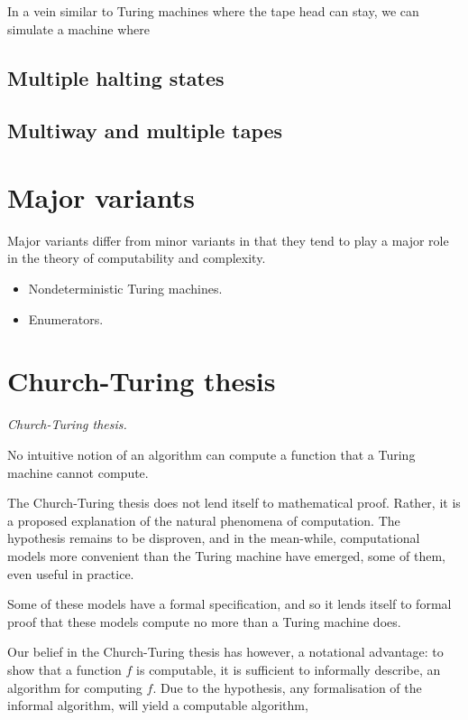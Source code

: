 In a vein similar to Turing machines where the tape head can stay, we can
simulate a machine where

\subsection{Multiple halting states}

\subsection{Multiway and multiple tapes}

\section{Major variants}

Major variants differ from minor variants in that they tend to play a major
role in the theory of computability and complexity.

\begin{itemize}

\item Nondeterministic Turing machines.

\item Enumerators.

\end{itemize}

\section{Church-Turing thesis}

\begin{hypothesis} \textit{Church-Turing thesis.}

No intuitive notion of an algorithm can compute a function that a Turing
machine cannot compute.

\end{hypothesis}

The Church-Turing thesis does not lend itself to mathematical proof. Rather, it
is a proposed explanation of the natural phenomena of computation. The
hypothesis remains to be disproven, and in the mean-while, computational models
more convenient than the Turing machine have emerged, some of them, even useful
in practice.

Some of these models have a formal specification, and so it lends itself to
formal proof that these models compute no more than a Turing machine does.

Our belief in the Church-Turing thesis has however, a notational advantage: to
show that a function $f$ is computable, it is sufficient to informally
describe, an algorithm for computing $f$. Due to the hypothesis, any
formalisation of the informal algorithm, will yield a computable algorithm,

